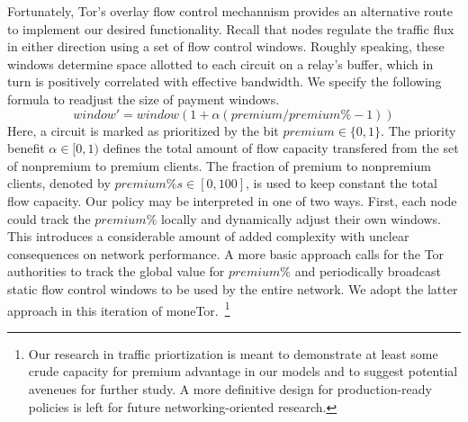 Fortunately, Tor's overlay flow control mechannism provides an alternative route
to implement our desired functionality. Recall that nodes regulate the traffic
flux in either direction using a set of flow control windows. Roughly speaking,
these windows determine space allotted to each circuit on a relay's buffer,
which in turn is positively correlated with effective bandwidth. We specify the
following formula to readjust the size of payment windows.
\begin{equation}
  window' = window(1+ \alpha(premium / premium\% - 1))
\end{equation}
Here, a circuit is marked as prioritized by the bit $premium \in \{0, 1\}$. The
priority benefit $\alpha \in [0, 1)$ defines the total amount of flow capacity
transfered from the set of nonpremium to premium clients. The fraction of
premium to nonpremium clients, denoted by $premium\%s \in [0,100]$, is used to
keep constant the total flow capacity. Our policy may be interpreted in one of
two ways. First, each node could track the $premium\%$ locally and dynamically
adjust their own windows. This introduces a considerable amount of added
complexity with unclear consequences on network performance. A more basic
approach calls for the Tor authorities to track the global value for $premium\%$
and periodically broadcast static flow control windows to be used by the entire
network. We adopt the latter approach in this iteration of
moneTor.~\footnote{Our research in traffic priortization is meant to demonstrate
  at least some crude capacity for premium advantage in our models and to
  suggest potential aveneues for further study. A more definitive design for
  production-ready policies is left for future networking-oriented research.}
